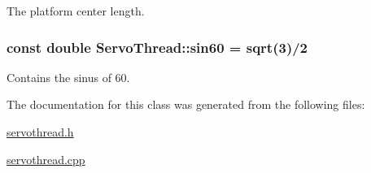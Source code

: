 The platform center length. 

\hypertarget{class_servo_thread_aaa3e2dd194949b12f8a41ebd0d62fde9}{}
\subsubsection[{sin60}]{\setlength{\rightskip}{0pt plus 5cm}const double Servo\+Thread\+::sin60 = sqrt(3)/2\hspace{0.3cm}{\ttfamily [private]}}\label{class_servo_thread_aaa3e2dd194949b12f8a41ebd0d62fde9}


Contains the sinus of 60. 



The documentation for this class was generated from the following files\+:\begin{DoxyCompactItemize}
\item 
\hyperlink{servothread_8h}{servothread.\+h}\item 
\hyperlink{servothread_8cpp}{servothread.\+cpp}\end{DoxyCompactItemize}
